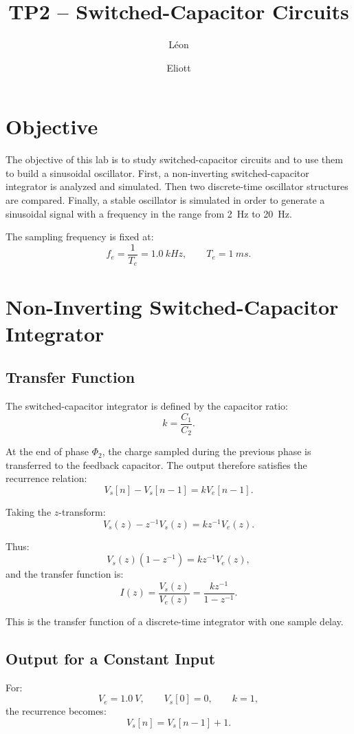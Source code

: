\documentclass[11pt,a4paper]{article}
\title{TP2 -- Switched-Capacitor Circuits}
\author{Léon \and Eliott}
\date{}
\begin{document}
\maketitle

\section{Objective}

The objective of this lab is to study switched-capacitor circuits and to use them to build a sinusoidal oscillator. First, a non-inverting switched-capacitor integrator is analyzed and simulated. Then two discrete-time oscillator structures are compared. Finally, a stable oscillator is simulated in order to generate a sinusoidal signal with a frequency in the range from \SI{2}{Hz} to \SI{20}{Hz}.

The sampling frequency is fixed at:
\[
f_e=\frac{1}{T_e}=\SI{1.0}{kHz},
\qquad
T_e=\SI{1}{ms}.
\]

\section{Non-Inverting Switched-Capacitor Integrator}

\subsection{Transfer Function}

The switched-capacitor integrator is defined by the capacitor ratio:
\[
k=\frac{C_1}{C_2}.
\]

At the end of phase $\Phi_2$, the charge sampled during the previous phase is transferred to the feedback capacitor. The output therefore satisfies the recurrence relation:
\[
V_s[n]-V_s[n-1]=kV_e[n-1].
\]

Taking the $z$-transform:
\[
V_s(z)-z^{-1}V_s(z)=kz^{-1}V_e(z).
\]

Thus:
\[
V_s(z)(1-z^{-1})=kz^{-1}V_e(z),
\]
and the transfer function is:
\[
I(z)=\frac{V_s(z)}{V_e(z)}
=
\frac{kz^{-1}}{1-z^{-1}}.
\]

This is the transfer function of a discrete-time integrator with one sample delay.

\subsection{Output for a Constant Input}

For:
\[
V_e=\SI{1.0}{V},
\qquad
V_s[0]=0,
\qquad
k=1,
\]
the recurrence becomes:
\[
V_s[n]=V_s[n-1]+1.
\]
\end{document}
